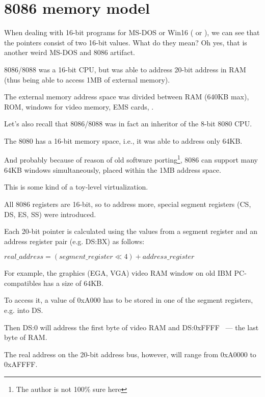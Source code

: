 \section{8086 memory model}
\label{8086_memory_model}

When dealing with 16-bit programs for MS-DOS or Win16
( or ),
we can see that the pointers consist of two 16-bit values.
What do they mean? Oh yes, that is another weird MS-DOS and 8086 artifact.

8086/8088 was a 16-bit CPU, but was able to address 20-bit address in RAM 
(thus being able to access 1MB of external memory).

The external memory address space was divided between \ac{RAM} (640KB max),
\ac{ROM}, windows for video memory, EMS cards, \etc{}.

Let's also recall that 8086/8088 was in fact an inheritor of the 8-bit 8080 CPU.

The 8080 has a 16-bit memory space, i.e., it was able to address only 64KB.

And probably because of reason of old software porting\footnote{The author is not 100\% sure here},
8086 can support many 64KB windows simultaneously, placed
within the 1MB address space.

This is some kind of a toy-level virtualization.

All 8086 registers are 16-bit, so to address more, special segment registers (CS, DS, ES, SS) were
introduced.

Each 20-bit pointer is calculated using the values from a segment register and 
an address register pair (e.g. DS:BX) as follows:

\begin{center}
$real\_address = (segment\_register \ll 4) + address\_register$
\end{center}

For example, the graphics (\ac{EGA}, \ac{VGA}) video \ac{RAM} window on old IBM PC-compatibles 
has a size of 64KB.

To access it, a value of 0xA000 has to be stored in one of the segment registers, e.g. into DS.

Then DS:0 will address the first byte of video \ac{RAM} and DS:0xFFFF ~--- the last byte of RAM.

The real address on the 20-bit address bus, however, will range from 0xA0000 to 0xAFFFF.

